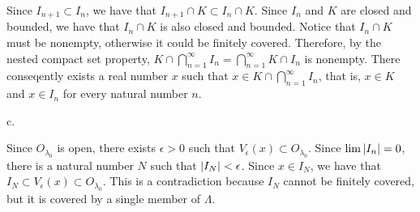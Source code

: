 Since $I_{n+1} \subset I_n$, we have that $I_{n+1} \cap K \subset I_n \cap K$.
Since $I_n$ and $K$ are closed and bounded,
we have that $I_n \cap K$ is also closed and bounded.
Notice that $I_n \cap K$ must be nonempty,
otherwise it could be finitely covered.
Therefore, by the nested compact set property,
$K \cap \bigcap _{n=1} ^\infty I_n = \bigcap _{n=1} ^\infty K \cap I_n$
is nonempty.
There conseqently exists a real number $x$
such that $x \in K \cap \bigcap _{n=1} ^\infty I_n$, that is,
$x \in K$ and $x \in I_n$ for every natural number $n$.
\medskip
\item{} c.

Since $O _{\lambda _0}$ is open, there exists $\epsilon > 0$ such that
$V _\epsilon (x) \subset O _{\lambda _0}$.
Since $\lim \vert I_n\vert = 0$, there is a natural number $N$ such that
$\vert I_N\vert < \epsilon$.
Since $x \in I_N$, we have that
$I_N \subset V _\epsilon (x) \subset O _{\lambda _0}$.
This is a contradiction because $I_N$ cannot be finitely covered,
but it is covered by a single member of $\Lambda$.
